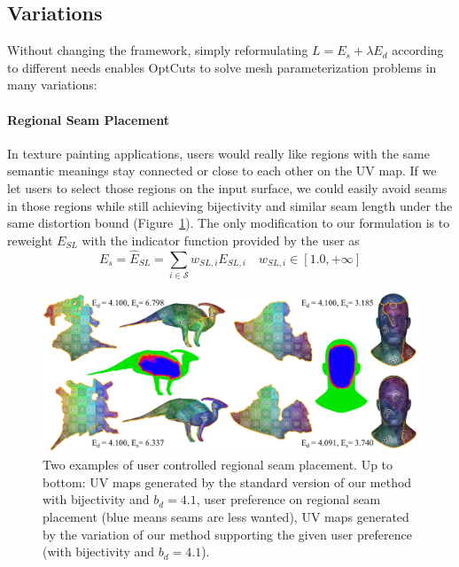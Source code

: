 \subsection{Variations}

Without changing the framework, simply reformulating $L = E_s + \lambda E_d$ according to different needs enables OptCuts to solve mesh parameterization problems in many variations:

\paragraph{Regional Seam Placement}
In texture painting applications, users would really like regions with the same semantic meanings stay connected or close to each other on the UV map. If we let users to select those regions on the input surface, we could easily avoid seams in those regions while still achieving bijectivity and similar seam length under the same distortion bound (Figure~\ref{fig:regional_seam_placement}). The only modification to our formulation is to reweight $E_{SL}$ with the indicator function provided by the user as
\[ E_s = \hat{E}_{SL} = \sum_{i\in\mathcal{S}} w_{SL,i} E_{SL,i} \quad w_{SL,i} \in [1.0, +\infty] \]

\begin{figure}[!h]
\centering
\includegraphics[width=\linewidth]{fig/regional_user.png}
\caption{Two examples of user controlled regional seam placement. Up to bottom: UV maps generated by the standard version of our method with bijectivity and $b_d = 4.1$, user preference on regional seam placement (blue means seams are less wanted), UV maps generated by the variation of our method supporting the given user preference (with bijectivity and $b_d = 4.1$). }
\label{fig:regional_seam_placement}
\end{figure}


